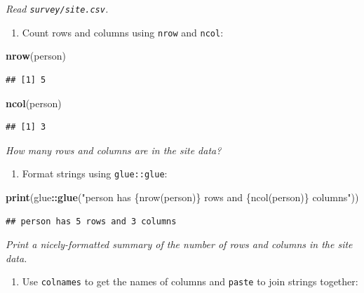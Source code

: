 \documentclass[]{Nemilov}
\newenvironment{Shaded}{\begin{snugshade}}{\end{snugshade}}
\newcommand{\KeywordTok}[1]{\textcolor[rgb]{0.13,0.29,0.53}{\textbf{#1}}}
\newcommand{\NormalTok}[1]{#1}
\newcommand{\OperatorTok}[1]{\textcolor[rgb]{0.81,0.36,0.00}{\textbf{#1}}}
\newcommand{\StringTok}[1]{\textcolor[rgb]{0.31,0.60,0.02}{#1}}
\providecommand{\tightlist}{%
  \setlength{\itemsep}{0pt}\setlength{\parskip}{0pt}}
\begin{document}
\emph{Read \texttt{survey/site.csv}.}

\begin{enumerate}
\def\labelenumi{\arabic{enumi}.}
\setcounter{enumi}{2}
\tightlist
\item
  Count rows and columns using \texttt{nrow} and \texttt{ncol}:
\end{enumerate}

\begin{Shaded}
\begin{Highlighting}[]
\KeywordTok{nrow}\NormalTok{(person)}
\end{Highlighting}
\end{Shaded}

\begin{verbatim}
## [1] 5
\end{verbatim}

\begin{Shaded}
\begin{Highlighting}[]
\KeywordTok{ncol}\NormalTok{(person)}
\end{Highlighting}
\end{Shaded}

\begin{verbatim}
## [1] 3
\end{verbatim}

\emph{How many rows and columns are in the site data?}

\begin{enumerate}
\def\labelenumi{\arabic{enumi}.}
\setcounter{enumi}{3}
\tightlist
\item
  Format strings using \texttt{glue::glue}:
\end{enumerate}

\begin{Shaded}
\begin{Highlighting}[]
\KeywordTok{print}\NormalTok{(glue}\OperatorTok{::}\KeywordTok{glue}\NormalTok{(}\StringTok{"person has \{nrow(person)\} rows and \{ncol(person)\} columns"}\NormalTok{))}
\end{Highlighting}
\end{Shaded}

\begin{verbatim}
## person has 5 rows and 3 columns
\end{verbatim}

\emph{Print a nicely-formatted summary of the number of rows and columns in the site data.}

\begin{enumerate}
\def\labelenumi{\arabic{enumi}.}
\setcounter{enumi}{4}
\tightlist
\item
  Use \texttt{colnames} to get the names of columns and \texttt{paste} to join strings together:
\end{enumerate}
\end{document}
